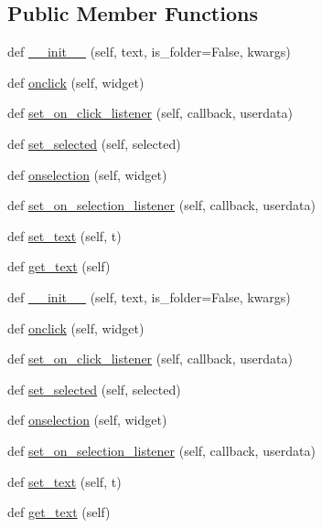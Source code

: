 \subsection*{Public Member Functions}
\begin{DoxyCompactItemize}
\item 
def \hyperlink{classremi_1_1gui_1_1FileFolderItem_afa70c682e41aa230b99f22b656eeb0eb}{\+\_\+\+\_\+init\+\_\+\+\_\+} (self, text, is\+\_\+folder=False, kwargs)
\item 
def \hyperlink{classremi_1_1gui_1_1FileFolderItem_a149faf73abba95f4d381b4ca1fbb3d81}{onclick} (self, widget)
\item 
def \hyperlink{classremi_1_1gui_1_1FileFolderItem_a38f58b3ef28a74d800d01450b6c24a63}{set\+\_\+on\+\_\+click\+\_\+listener} (self, callback, userdata)
\item 
def \hyperlink{classremi_1_1gui_1_1FileFolderItem_afdf1beb86fe8e477b402b36081d2eae6}{set\+\_\+selected} (self, selected)
\item 
def \hyperlink{classremi_1_1gui_1_1FileFolderItem_a45ca805f6423493be1092ee380f4acb5}{onselection} (self, widget)
\item 
def \hyperlink{classremi_1_1gui_1_1FileFolderItem_a9411315a65d4436da290cbdf89a8ee1e}{set\+\_\+on\+\_\+selection\+\_\+listener} (self, callback, userdata)
\item 
def \hyperlink{classremi_1_1gui_1_1FileFolderItem_ac6df7476ed50597c6c3a29a678d105ae}{set\+\_\+text} (self, t)
\item 
def \hyperlink{classremi_1_1gui_1_1FileFolderItem_a8413d5b10fe277bd6b4e40a27e153519}{get\+\_\+text} (self)
\item 
def \hyperlink{classremi_1_1gui_1_1FileFolderItem_afa70c682e41aa230b99f22b656eeb0eb}{\+\_\+\+\_\+init\+\_\+\+\_\+} (self, text, is\+\_\+folder=False, kwargs)
\item 
def \hyperlink{classremi_1_1gui_1_1FileFolderItem_a149faf73abba95f4d381b4ca1fbb3d81}{onclick} (self, widget)
\item 
def \hyperlink{classremi_1_1gui_1_1FileFolderItem_a38f58b3ef28a74d800d01450b6c24a63}{set\+\_\+on\+\_\+click\+\_\+listener} (self, callback, userdata)
\item 
def \hyperlink{classremi_1_1gui_1_1FileFolderItem_afdf1beb86fe8e477b402b36081d2eae6}{set\+\_\+selected} (self, selected)
\item 
def \hyperlink{classremi_1_1gui_1_1FileFolderItem_a45ca805f6423493be1092ee380f4acb5}{onselection} (self, widget)
\item 
def \hyperlink{classremi_1_1gui_1_1FileFolderItem_a9411315a65d4436da290cbdf89a8ee1e}{set\+\_\+on\+\_\+selection\+\_\+listener} (self, callback, userdata)
\item 
def \hyperlink{classremi_1_1gui_1_1FileFolderItem_ac6df7476ed50597c6c3a29a678d105ae}{set\+\_\+text} (self, t)
\item 
def \hyperlink{classremi_1_1gui_1_1FileFolderItem_a8413d5b10fe277bd6b4e40a27e153519}{get\+\_\+text} (self)
\end{DoxyCompactItemize}
